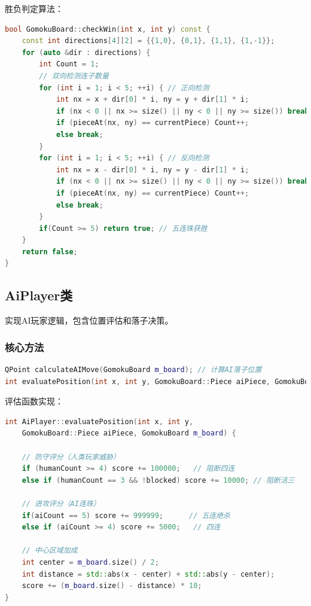 \documentclass[UTF8]{ctexart}
\begin{document}
胜负判定算法：
\begin{lstlisting}[language=C++]
bool GomokuBoard::checkWin(int x, int y) const {
    const int directions[4][2] = {{1,0}, {0,1}, {1,1}, {1,-1}};
    for (auto &dir : directions) {
        int Count = 1;
        // 双向检测连子数量
        for (int i = 1; i < 5; ++i) { // 正向检测
            int nx = x + dir[0] * i, ny = y + dir[1] * i;
            if (nx < 0 || nx >= size() || ny < 0 || ny >= size()) break;
            if (pieceAt(nx, ny) == currentPiece) Count++;
            else break;
        }
        for (int i = 1; i < 5; ++i) { // 反向检测
            int nx = x - dir[0] * i, ny = y - dir[1] * i;
            if (nx < 0 || nx >= size() || ny < 0 || ny >= size()) break;
            if (pieceAt(nx, ny) == currentPiece) Count++;
            else break;
        }
        if(Count >= 5) return true; // 五连珠获胜
    }
    return false;
}
\end{lstlisting}

\subsection{AiPlayer类}
实现AI玩家逻辑，包含位置评估和落子决策。

\subsubsection{核心方法}
\begin{lstlisting}[language=C++, caption=aiplayer.h]
QPoint calculateAIMove(GomokuBoard m_board); // 计算AI落子位置
int evaluatePosition(int x, int y, GomokuBoard::Piece aiPiece, GomokuBoard m_board); // 位置评估
\end{lstlisting}

评估函数实现：
\begin{lstlisting}[language=C++]
int AiPlayer::evaluatePosition(int x, int y, 
    GomokuBoard::Piece aiPiece, GomokuBoard m_board) {
    
    // 防守评分（人类玩家威胁）
    if (humanCount >= 4) score += 100000;   // 阻断四连
    else if (humanCount == 3 && !blocked) score += 10000; // 阻断活三
    
    // 进攻评分（AI连珠）
    if(aiCount == 5) score += 999999;      // 五连绝杀
    else if (aiCount >= 4) score += 5000;   // 四连
    
    // 中心区域加成
    int center = m_board.size() / 2;
    int distance = std::abs(x - center) + std::abs(y - center);
    score += (m_board.size() - distance) * 10;
}
\end{lstlisting}
\end{document}
